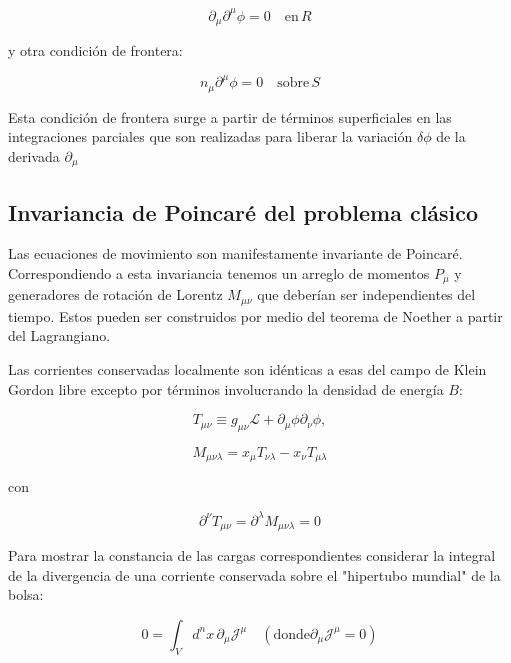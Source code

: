 \begin{equation}
{\partial}_{\mu} {\partial}^{\mu} {\phi} = 0 \quad \mathrm{en} \, R
\end{equation}

y otra condición de frontera:

\begin{equation}
{n}_{\mu} {\partial}^{\mu} {\phi} = 0 \quad \mathrm{sobre} \, S
\end{equation}

Esta condición de frontera surge a partir de términos superficiales en las integraciones parciales que son realizadas para liberar la variación $\delta \phi$ de la derivada ${\partial}_{\mu}$

\subsection{Invariancia de Poincaré del problema clásico}

Las ecuaciones de movimiento son manifestamente invariante de Poincaré. Correspondiendo a esta invariancia tenemos un arreglo de momentos ${P}_{\mu}$ y generadores de rotación de Lorentz ${M}_{\mu \nu}$ que deberían ser independientes del tiempo. Estos pueden ser construidos por medio del teorema de Noether a partir del Lagrangiano. 

Las corrientes conservadas localmente son idénticas a esas del campo de Klein Gordon libre excepto por términos involucrando la densidad de energía $B$:

\begin{equation}
{T}_{\mu \nu} \equiv {g}_{\mu \nu} \mathscr{L} + {\partial}_{\mu} {\phi} {\partial}_{\nu} {\phi},
\end{equation}

\begin{equation}
{M}_{\mu \nu \lambda} = {x}_{\mu} {T}_{\nu \lambda} - {x}_{\nu} {T}_{\mu \lambda}
\end{equation}

con

\[
{\partial}^{\nu} {T}_{\mu \nu} = {\partial}^{\lambda} {M}_{\mu \nu \lambda} = 0
\]

Para mostrar la constancia de las cargas correspondientes considerar la integral de la divergencia de una corriente conservada sobre el "hipertubo mundial" de la bolsa:

\begin{equation}
0 = \int_{V} {d}^{n} x \, {\partial}_{\mu} \mathscr{J}^{\mu} \quad (\mathrm{donde} {\partial}_{\mu} \mathscr{J}^{\mu} = 0)
\end{equation}

